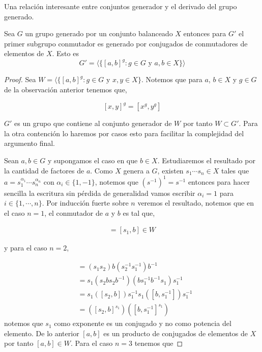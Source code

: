 Una relación interesante entre conjuntos generador y el derivado del grupo generado. 
\begin{pr} \label{pr:Derivados_y_generadores}

Sea $G$ un grupo  generado por un conjunto balanceado $X$ entonces para $G'$ el primer subgrupo conmutador es generado por conjugados de conmutadores de elementos de $X$. Esto es
$$G'=\langle\{ [a,b]^{g}: g \in G \text{ y } a, b \in X \} \rangle$$
\end{pr}

\begin{proof}

Sea $W=\langle\{ [a,b]^{g} : g \in G \text{ y } x,y \in X \}$. Notemos que para $a$, $b \in X$ y $g \in G$ de la observación anterior tenemos que,

$$[x,y]^{g}=[x^{g},y^{g}]$$

$G'$ es un grupo que contiene al conjunto generador de $W$ por tanto $W \subset  G'.$ Para la otra contención lo haremos por casos esto para facilitar la complejidad del argumento final. 

Sean $a, b \in G$ y supongamos el caso en que $b \in X$. Estudiaremos el resultado por la cantidad de factores de  $a$. Como $X$ genera a $G$, existen $s_1 \cdots s_n \in X$ tales que $a= s_1^{\alpha_1} \cdots s_n^{\alpha_n}$ con $\alpha_i \in \{1, -1\}$, notemos que $(s^{-1})^1=s^{-1}$ entonces para hacer sencilla la escritura sin pérdida de generalidad vamos escribir  $\alpha_i=1$ para $i \in \{1, \cdots, n\}$.  Por inducción fuerte sobre $n$ veremos el resultado, notemos que en el caso $n=1$, el conmutador de $a$ y $b$ es tal que,

\begin{align*}
[a,b]=[s_1,b] \in W
\end{align*}

y para el caso $n=2$,

\begin{align*}
[s_1s_2,b] & =(s_1s_2)b(s_2^{-1}s_1^{-1})b^{-1} \\
& = s_1(s_2bs_2b^{-1})(bs_1^{-1}b^{-1}s_1)s_1^{-1}\\
& = s_1([s_2,b])s_1^{-1}s_1([b,s_1^{-1}])s_1^{-1}\\
& = ([s_2,b]^{s_1})([b,s_1^{-1}]^{s_1})
\end{align*}
notemos que $s_1$ como exponente es un conjugado y no como potencia del elemento. De lo anterior $[a,b]$ es un producto de conjugados de elementos de $X$ por 
tanto $[a,b] \in W.$ Para el caso $n=3$ tenemos que 


\end{proof}
